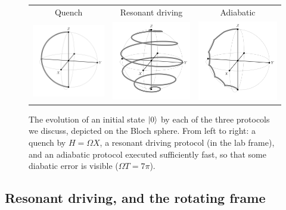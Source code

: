 \renewcommand{\arraystretch}{1} %
\setlength\tabcolsep{0.1cm} %
\begin{figure}
\centering
\begin{tabular}{ccc}
\footnotesize Quench & \footnotesize Resonant driving & \footnotesize Adiabatic \\
\includegraphics[width=.32\textwidth]{img/blochgate_quench_vec.pdf} &
\includegraphics[width=.32\textwidth]{img/blochgate_res_vec.pdf}  	& 
\includegraphics[width=.32\textwidth]{img/blochgate_adiab_vec.pdf}	
\end{tabular}
\caption{The evolution of an initial state $\lvert0\rangle$ by each of the three protocols we discuss, depicted on the Bloch sphere. From left to right: a quench by $H=\Omega X$, a resonant driving protocol (in the lab frame), and an adiabatic protocol executed sufficiently fast, so that some diabatic error is visible ($\Omega T = 7 \pi$). }
\label{fig:xgate_blochsphere}
\end{figure}


\subsection{Resonant driving, and the rotating frame}
\label{sec:resonantdriving}

